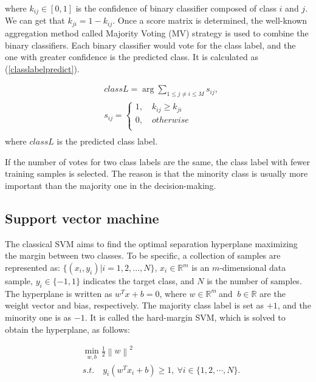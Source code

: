 \noindent where $k_{ij}\in{ [0,1]}$ is the confidence of binary classifier composed of class $i$ and $j$. We can get that $k_{ji}=1-k_{ij}$. Once a score matrix is determined, the well-known aggregation method called Majority Voting (MV) strategy \cite{Friedman:96} is used to combine the binary classifiers. Each binary classifier would vote for the class label, and the one with greater confidence is the predicted class. It is calculated as (\ref{classlabelpredict}).

\begin{equation}\label{classlabelpredict}
	\begin{split}
		& classL = \mathop{\arg\max_{i=1,...,M}}\sum_{1\leq j\neq i\leq M}s_{ij},\\
		& s_{ij} = \left\{
		\begin{array}{rcl}
			1,\quad k_{ij}\geq k_{ji}\\
			0,\quad otherwise\\
		\end{array} \right. \\
	\end{split}
\end{equation}
\noindent where $classL$ is the predicted class label.

If the number of votes for two class labels are the same, the class label with fewer training samples is selected. The reason is that the minority class is usually more important than the majority one in the decision-making.

\subsection{Support vector machine}
\label{SVM}

The classical SVM aims to find the optimal separation hyperplane maximizing the margin between two classes. To be specific, a collection of samples are represented as: $\{(x_i,y_i)| i = 1,2,...,N\}$, $ x_i \in \mathbb{R}^m $ is an $ m $-dimensional data sample, $ y_i \in \{-1,1\}$ indicates the target class, and $ N $ is the number of samples. The hyperplane is written as $w^Tx + b = 0 $, where $w\in \mathbb{R}^m \ $and $\ b\in \mathbb{R}$ are the weight vector and bias, respectively. The majority class label is set as $ +1 $, and the minority one is as $ -1 $. It is called the hard-margin SVM, which is solved to obtain the hyperplane, as follows:

\begin{equation}\label{TraditionalSVM}
	\begin{split}
		&\mathop{\min}\limits_{w,b}\frac{1}{2}{\left \|w \right \|}^{2}\\
		& s.t. \quad y_i(w^Tx_i+b)\ge 1, \ \forall i\in \{1,2,\cdots,N\}.
	\end{split}
\end{equation}

